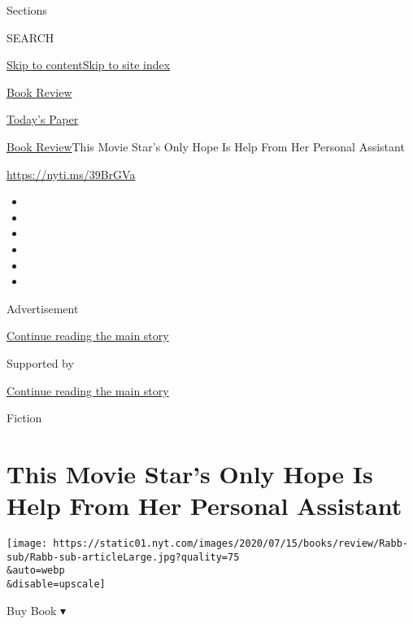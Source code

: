 Sections

SEARCH

\protect\hyperlink{site-content}{Skip to
content}\protect\hyperlink{site-index}{Skip to site index}

\href{https://www.nytimes.com/section/books/review}{Book Review}

\href{https://myaccount.nytimes.com/auth/login?response_type=cookie\&client_id=vi}{}

\href{https://www.nytimes.com/section/todayspaper}{Today's Paper}

\href{/section/books/review}{Book Review}\textbar{}This Movie Star's
Only Hope Is Help From Her Personal Assistant

\url{https://nyti.ms/39BrGVa}

\begin{itemize}
\item
\item
\item
\item
\item
\item
\end{itemize}

Advertisement

\protect\hyperlink{after-top}{Continue reading the main story}

Supported by

\protect\hyperlink{after-sponsor}{Continue reading the main story}

Fiction

\hypertarget{this-movie-stars-only-hope-is-help-from-her-personal-assistant}{%
\section{This Movie Star's Only Hope Is Help From Her Personal
Assistant}\label{this-movie-stars-only-hope-is-help-from-her-personal-assistant}}

\texttt{[image: https://static01.nyt.com/images/2020/07/15/books/review/Rabb-sub/Rabb-sub-articleLarge.jpg?quality=75\\\&auto=webp\\\&disable=upscale]}

Buy Book ▾


